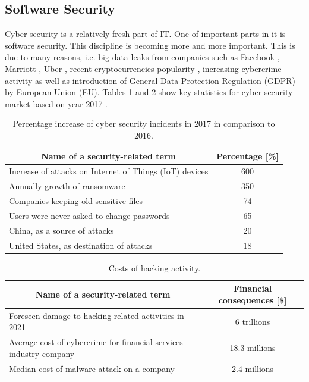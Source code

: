 \documentclass{article} %
\begin{document}
\subsection{Software Security}
Cyber security is a relatively fresh part of IT. One of important parts in it is software security. This discipline is becoming more and more important. This is due to many reasons, i.e. big data leaks from companies such as Facebook \cite{bib:facebook_data_breach}, Marriott \cite{bib:marriott_data_breach}, Uber \cite{bib:uber_data_breach}, recent cryptocurrencies popularity \cite{bib:cryptocurrencies_hacking}, increasing cybercrime activity as well as introduction of General Data Protection Regulation (GDPR) \cite{bib:gdpr_eu} by European Union (EU). Tables \ref{tab:increase_statistics} and \ref{tab:numbers_statistics} show key statistics for cyber security market based on year 2017 \cite{bib:cyber_security_incidents}.
\begin{table}[ht]
\centering
    \begin{tabular}{ | l | c |}
    \hline
    \multicolumn{1}{|c|}{\textbf{Name of a security-related term}} & \multicolumn{1}{c|}{\textbf{Percentage [\%]}} \\ \hline
    Increase of attacks on Internet of Things (IoT) devices & 600 \\ \hline
    Annually growth of ransomware & 350 \\ \hline
    Companies keeping old sensitive files & 74 \\ \hline
    Users were never asked to change passwords & 65 \\ \hline
    China, as a source of attacks & 20 \\ \hline
    United States, as destination of attacks & 18 \\ \hline
    \end{tabular}
\caption{Percentage increase of cyber security incidents in 2017 in comparison to 2016.}
\label{tab:increase_statistics}
\end{table}
\begin{table}[ht]
\hspace*{-1cm}
\centering
    \begin{tabular}{ | l | c |}
    \hline
    \multicolumn{1}{|c|}{\textbf{Name of a security-related term}} & \multicolumn{1}{c|}{\textbf{Financial consequences [\$]}} \\ \hline
    Foreseen damage to hacking\index{Hacking}-related activities in 2021 & 6 trillions \\ \hline
    Average cost of cybercrime\index{Cybercrime} for financial services industry company & 18.3 millions \\ \hline
    Median cost of malware\index{Malware} attack on a company & 2.4 millions \\ \hline
    \end{tabular}
\caption{Costs of hacking activity.}
\label{tab:numbers_statistics}
\hspace*{-1cm}
\end{table}\\
\end{document}
